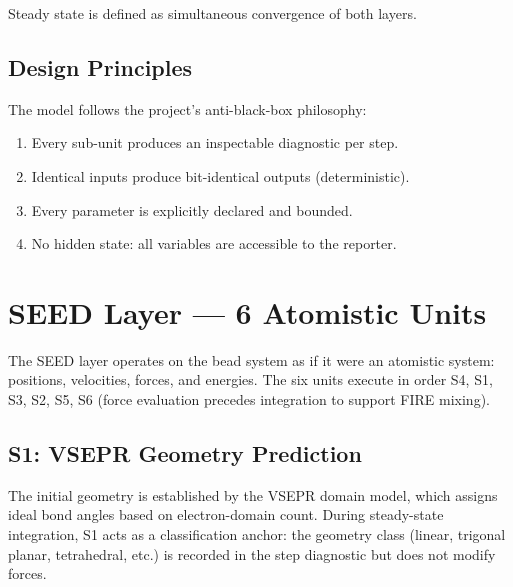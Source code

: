 \documentclass[11pt, a4paper, oneside]{article}
\begin{document}
\noindent Steady state is defined as simultaneous convergence of both layers.

\subsection{Design Principles}
\label{sec:design-principles}

The model follows the project's anti-black-box philosophy:
\begin{enumerate}
  \item Every sub-unit produces an inspectable diagnostic per step.
  \item Identical inputs produce bit-identical outputs (deterministic).
  \item Every parameter is explicitly declared and bounded.
  \item No hidden state: all variables are accessible to the reporter.
\end{enumerate}

\newpage
\section{SEED Layer — 6 Atomistic Units}
\label{sec:seed-layer}

The SEED layer operates on the bead system as if it were an atomistic
system: positions, velocities, forces, and energies.  The six units
execute in order S4, S1, S3, S2, S5, S6 (force evaluation precedes
integration to support FIRE mixing).

\subsection{S1: VSEPR Geometry Prediction}
\label{sec:s1-vsepr}

The initial geometry is established by the VSEPR domain model,
which assigns ideal bond angles based on electron-domain count.
During steady-state integration, S1 acts as a classification
anchor: the geometry class (linear, trigonal planar, tetrahedral, etc.)
is recorded in the step diagnostic but does not modify forces.
\end{document}

